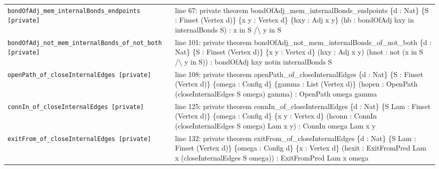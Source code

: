 \documentclass[10pt]{article}
\begin{document}
\begin{longtable}{>{\raggedright\arraybackslash}p{} >{\raggedright\arraybackslash}p{}}
\texttt{bondOfAdj\_\allowbreak{}mem\_\allowbreak{}internalBonds\_\allowbreak{}endpoints [private]} & {\ttfamily\scriptsize line 67:\allowbreak{} private theorem bondOfAdj\_\allowbreak{}mem\_\allowbreak{}internalBonds\_\allowbreak{}endpoints \{d :\allowbreak{} Nat\} \{S :\allowbreak{} Finset (\allowbreak{}Vertex d)\allowbreak{}\} \{x y :\allowbreak{} Vertex d\} \{hxy :\allowbreak{} Adj x y\} (\allowbreak{}hb :\allowbreak{} bondOfAdj hxy in internalBonds S)\allowbreak{} :\allowbreak{} x in S /\allowbreak{}\textbackslash{} y in S} \\[0.45em]
\texttt{bondOfAdj\_\allowbreak{}not\_\allowbreak{}mem\_\allowbreak{}internalBonds\_\allowbreak{}of\_\allowbreak{}not\_\allowbreak{}both [private]} & {\ttfamily\scriptsize line 101:\allowbreak{} private theorem bondOfAdj\_\allowbreak{}not\_\allowbreak{}mem\_\allowbreak{}internalBonds\_\allowbreak{}of\_\allowbreak{}not\_\allowbreak{}both \{d :\allowbreak{} Nat\} \{S :\allowbreak{} Finset (\allowbreak{}Vertex d)\allowbreak{}\} \{x y :\allowbreak{} Vertex d\} (\allowbreak{}hxy :\allowbreak{} Adj x y)\allowbreak{} (\allowbreak{}hnot :\allowbreak{} not (\allowbreak{}x in S /\allowbreak{}\textbackslash{} y in S)\allowbreak{})\allowbreak{} :\allowbreak{} bondOfAdj hxy notin internalBonds S} \\[0.45em]
\texttt{openPath\_\allowbreak{}of\_\allowbreak{}closeInternalEdges [private]} & {\ttfamily\scriptsize line 108:\allowbreak{} private theorem openPath\_\allowbreak{}of\_\allowbreak{}closeInternalEdges \{d :\allowbreak{} Nat\} \{S :\allowbreak{} Finset (\allowbreak{}Vertex d)\allowbreak{}\} \{omega :\allowbreak{} Config d\} \{gamma :\allowbreak{} List (\allowbreak{}Vertex d)\allowbreak{}\} (\allowbreak{}hopen :\allowbreak{} OpenPath (\allowbreak{}closeInternalEdges S omega)\allowbreak{} gamma)\allowbreak{} :\allowbreak{} OpenPath omega gamma} \\[0.45em]
\texttt{connIn\_\allowbreak{}of\_\allowbreak{}closeInternalEdges [private]} & {\ttfamily\scriptsize line 125:\allowbreak{} private theorem connIn\_\allowbreak{}of\_\allowbreak{}closeInternalEdges \{d :\allowbreak{} Nat\} \{S Lam :\allowbreak{} Finset (\allowbreak{}Vertex d)\allowbreak{}\} \{omega :\allowbreak{} Config d\} \{x y :\allowbreak{} Vertex d\} (\allowbreak{}hconn :\allowbreak{} ConnIn (\allowbreak{}closeInternalEdges S omega)\allowbreak{} Lam x y)\allowbreak{} :\allowbreak{} ConnIn omega Lam x y} \\[0.45em]
\texttt{exitFrom\_\allowbreak{}of\_\allowbreak{}closeInternalEdges [private]} & {\ttfamily\scriptsize line 132:\allowbreak{} private theorem exitFrom\_\allowbreak{}of\_\allowbreak{}closeInternalEdges \{d :\allowbreak{} Nat\} \{S Lam :\allowbreak{} Finset (\allowbreak{}Vertex d)\allowbreak{}\} \{omega :\allowbreak{} Config d\} \{x :\allowbreak{} Vertex d\} (\allowbreak{}hexit :\allowbreak{} ExitFromPred Lam x (\allowbreak{}closeInternalEdges S omega)\allowbreak{})\allowbreak{} :\allowbreak{} ExitFromPred Lam x omega} \\[0.45em]

\end{longtable}
\end{document}
